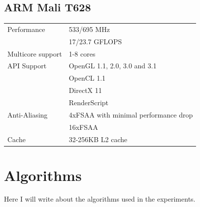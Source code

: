 \subsection{ARM Mali T628}
\begin{table}[H]
  \begin{tabular}{ll}
    Performance       & 533/695 MHz \\
                      & 17/23.7 GFLOPS \\
    Multicore support & 1-8 cores  \\
    API Support       & OpenGL 1.1, 2.0, 3.0 and 3.1  \\
                      & OpenCL 1.1  \\
                      & DirectX 11  \\
                      & RenderScript \\
    Anti-Aliasing     & 4xFSAA with minimal performance drop  \\
                      & 16xFSAA  \\
    Cache             & 32-256KB L2 cache
  \end{tabular}
\end{table}

\section{Algorithms}
Here I will write about the algorithms used in the experiments.

